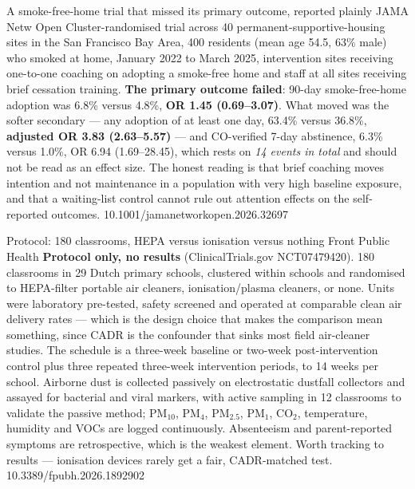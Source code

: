 \documentclass[10pt]{article}
\begin{document}
{A smoke-free-home trial that missed its primary outcome, reported plainly}
{JAMA Netw Open}
{Cluster-randomised trial across 40 permanent-supportive-housing sites in the San Francisco
Bay Area, 400 residents (mean age 54.5, 63\% male) who smoked at home, January 2022 to March
2025, intervention sites receiving one-to-one coaching on adopting a smoke-free home and
staff at all sites receiving brief cessation training. \textbf{The primary outcome failed}:
90-day smoke-free-home adoption was 6.8\% versus 4.8\%, \textbf{OR 1.45 (0.69--3.07)}. What
moved was the softer secondary --- any adoption of at least one day, 63.4\% versus 36.8\%,
\textbf{adjusted OR 3.83 (2.63--5.57)} --- and CO-verified 7-day abstinence, 6.3\% versus
1.0\%, OR 6.94 (1.69--28.45), which rests on \emph{14 events in total} and should not be
read as an effect size. The honest reading is that brief coaching moves intention and not
maintenance in a population with very high baseline exposure, and that a waiting-list
control cannot rule out attention effects on the self-reported outcomes.}
{10.1001/jamanetworkopen.2026.32697}

{Protocol: 180 classrooms, HEPA versus ionisation versus nothing}
{Front Public Health}
{\textbf{Protocol only, no results} (ClinicalTrials.gov NCT07479420). 180 classrooms in 29
Dutch primary schools, clustered within schools and randomised to HEPA-filter portable air
cleaners, ionisation/plasma cleaners, or none. Units were laboratory pre-tested, safety
screened and operated at comparable clean air delivery rates --- which is the design choice
that makes the comparison mean something, since CADR is the confounder that sinks most
field air-cleaner studies. The schedule is a three-week baseline or two-week post-intervention
control plus three repeated three-week intervention periods, to 14 weeks per school. Airborne
dust is collected passively on electrostatic dustfall collectors and assayed for bacterial and
viral markers, with active sampling in 12 classrooms to validate the passive method;
PM$_{10}$, PM$_4$, PM$_{2.5}$, PM$_1$, CO$_2$, temperature, humidity and VOCs are logged
continuously. Absenteeism and parent-reported symptoms are retrospective, which is the
weakest element. Worth tracking to results --- ionisation devices rarely get a fair,
CADR-matched test.}
{10.3389/fpubh.2026.1892902}
\end{document}
